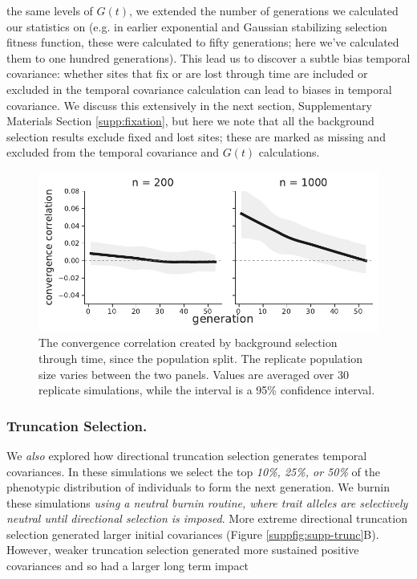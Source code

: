 \documentclass[11pt]{article}
\newcommand{\vb}[1]{{\it \color{blue} #1}}
\begin{document}
the same levels of $G(t)$, we extended the number of generations we calculated
our statistics on (e.g. in earlier exponential and Gaussian stabilizing
selection fitness function, these were calculated to fifty generations; here
we've calculated them to one hundred generations). This lead us to discover a
subtle bias temporal covariance: whether sites that fix or are lost through
time are included or excluded in the temporal covariance calculation can lead
to biases in temporal covariance. We discuss this extensively in the next
section, Supplementary Materials Section \ref{supp:fixation}, but here we note
that all the background selection results exclude fixed and lost sites; these
are marked as missing and excluded from the temporal covariance and $G(t)$
calculations.

\begin{figure}[!ht]
  \centering
  \includegraphics[width=\textwidth]{figures/fig-bgs-convergence-correlation.pdf}

  \caption{The convergence correlation created by background selection through
    time, since the population split. The replicate population size varies
    between the two panels. Values are averaged over 30 replicate simulations,
    while the interval is a 95\% confidence interval.}

  \label{suppfig:supp-bgs-converg}
\end{figure}


\subsubsection{Truncation Selection.}

We \vb{also} explored how directional truncation selection generates temporal
covariances. In these simulations we select the top \vb{10\%, 25\%, or 50\%} of
the phenotypic distribution of individuals to form the next generation. We
burnin these simulations \vb{using a neutral burnin routine, where trait
alleles are selectively neutral until directional selection is imposed}. More
extreme directional truncation selection generated larger initial covariances
(Figure \ref{suppfig:supp-trunc}B).  However, weaker truncation selection
generated more sustained positive covariances and so had a larger long term
impact 
\end{document}
